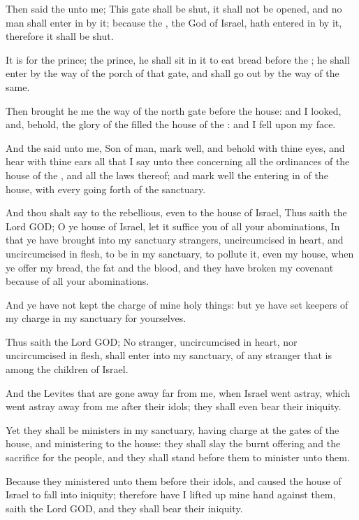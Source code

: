 \verse Then said the \LORD unto me; This gate shall be shut, it shall not be opened, and no man shall enter in by it; because the \LORD, the God of Israel, hath entered in by it, therefore it shall be shut.

\verse It is for the prince; the prince, he shall sit in it to eat bread before the \LORD; he shall enter by the way of the porch of that gate, and shall go out by the way of the same.

\verse Then brought he me the way of the north gate before the house: and I looked, and, behold, the glory of the \LORD filled the house of the \LORD: and I fell upon my face.

\verse And the \LORD said unto me, Son of man, mark well, and behold with thine eyes, and hear with thine ears all that I say unto thee concerning all the ordinances of the house of the \LORD, and all the laws thereof; and mark well the entering in of the house, with every going forth of the sanctuary.

\verse And thou shalt say to the rebellious, even to the house of Israel, Thus saith the Lord GOD; O ye house of Israel, let it suffice you of all your abominations, \verse In that ye have brought into my sanctuary strangers, uncircumcised in heart, and uncircumcised in flesh, to be in my sanctuary, to pollute it, even my house, when ye offer my bread, the fat and the blood, and they have broken my covenant because of all your abominations.

\verse And ye have not kept the charge of mine holy things: but ye have set keepers of my charge in my sanctuary for yourselves.

\verse Thus saith the Lord GOD; No stranger, uncircumcised in heart, nor uncircumcised in flesh, shall enter into my sanctuary, of any stranger that is among the children of Israel.

\verse And the Levites that are gone away far from me, when Israel went astray, which went astray away from me after their idols; they shall even bear their iniquity.

\verse Yet they shall be ministers in my sanctuary, having charge at the gates of the house, and ministering to the house: they shall slay the burnt offering and the sacrifice for the people, and they shall stand before them to minister unto them.

\verse Because they ministered unto them before their idols, and caused the house of Israel to fall into iniquity; therefore have I lifted up mine hand against them, saith the Lord GOD, and they shall bear their iniquity.

